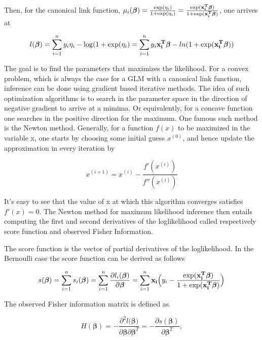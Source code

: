 Then, for the canonical link function, $\mu_i(\bm{\beta}) = \frac{\exp(\eta_i)}{1+\exp(\eta_i)} = \frac{\exp({\bf x_i^T} \bm{ \beta})}{1+\exp({\bf x_i^T} \bm{ \beta})}$, one arrives at

\begin{equation}
    l(\bm{\beta}) = \sum_{i=1}^{n} y_i \eta_i - \log(1 + \exp(\eta_i) = \sum_{i=1}^n y_i{\bf x_i^T} \bm{ \beta} - ln(1 + \exp(\bf x_i^T \bm{ \beta}))
\end{equation}

The goal is to find the parameters that maximizes the likelihood. For a convex problem, which is always the case for a GLM with a canonical link function, inference can be done using gradient based iterative methods. The idea of such optimization algorithms is to search in the parameter space in the direction of negative gradient to arrive at a mimima. Or equivalently, for a concave function one searches in the positive direction for the maximum. One famous such method is the Newton method. Generally, for a function $f(x)$ to be maximized in the variable x, one starts by choosing some initial guess $x^{(0)}$, and hence update the approximation in every iteration by

\begin{equation}
    x^{(i+1)} = x^{(i)} - \frac{f'(x^{(i)})}{f''(x^{(i)})}
\end{equation}

It's easy to see that the value of x at which this algorithm converges satisfies $f'(x)=0$. The Newton method for maximum likelihood inference then entails computing the first and second derivatives of the loglikelihood called respectively score function and observed Fisher Information.

The score function is the vector of partial derivatives of the loglikelihood. In the Bernoulli case the score function can be derived as follows

\begin{equation}
\label{eq:score}
s(\bm{\beta}) = \sum_{i=1}^{n}s_i(\bm{\beta}) = \sum_{i=1}^{n} \frac{\partial l_i(\bm{\beta})}{\partial \bm{\beta}} = \sum_{i=1}^{n} {\bf x_i} \Big ( y_i - \frac{\exp({\bf x_i^T} \bm{ \beta})}{1 + \exp({\bf x_i^T} \bm{ \beta})}\Big )
\end{equation}

The observed Fisher information matrix is defined as 

\begin{equation}
    H(\bm {\beta}) = - \frac{\partial^2 l(\bm {\beta)}}{\partial \bm{\beta} \partial \bm{\beta}^T} = -\frac{\partial s(\bm{\beta})}{\partial \bm{\beta}^T},
\end{equation}

